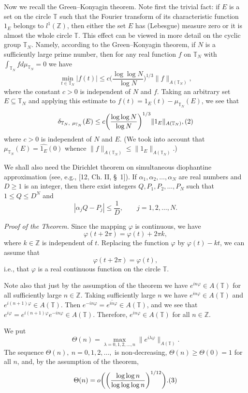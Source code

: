 \documentclass[12pt]{article}
\begin{document}
  Now we recall the Green--Konyagin theorem. Note first the
trivial fact: if $E$ is a set on the circle $\mathbb T$ such that
the Fourier transform of its characteristic function $1_E$ belongs
to $l^1(\mathbb Z)$, then either the set $E$ has (Lebesgue)
measure zero or it is almost the whole circle $\mathbb T$. This
effect can be viewed in more detail on the cyclic group $\mathbb
T_N$. Namely, according to the Green--Konyagin theorem, if $N$ is
a sufficiently large prime number, then for any real function $f$
on $\mathbb T_N$ with $\int_{\mathbb T_N}f d\mu_{\mathbb T_N}=0$
we have
$$
\min_{t\in\mathbb T_N}|f(t)|\leq
c\bigg(\frac{\log\log N}{\log N}\bigg)^{1/3}\|f\|_{A(\mathbb T_N)},
$$
where the constant $c>0$ is independent of $N$ and $f$. Taking an
arbitrary set $E\subseteq\mathbb T_N$ and applying this estimate
to $f(t)=1_E(t)-\mu_{\mathbb T_N}(E)$, we see that
$$
\delta_{\mathbb T_N, ~\mu_{\mathbb T_N}}(E)\leq
c \bigg(\frac{\log\log N}{\log N}\bigg)^{1/3}\|1_E\|_{A(\mathbb T_N)},
\relax(2)
$$
where $c>0$ is independent of $N$ and $E$. (We took into account
that $\mu_{\mathbb T_N}(E)=\widehat{1_E}(0)$ whence
$\|f\|_{A(\mathbb T_N)}\leq\|1_E\|_{A(\mathbb T_N)}$.)

  We shall also need the Dirichlet theorem on
simultaneous diophantine approximation (see, e.g., [12, Ch. II,
\S~1]). If $\alpha_1, \alpha_2, \ldots, \alpha_N$ are real numbers
and $D\geq 1$ is an integer, then there exist integers $Q, P_1,
P_2, \ldots, P_N$ such that $1\leq Q\leq D^N$ and
$$
|\alpha_jQ-P_j|\leq\frac{1}{D}, \qquad j=1, 2, \ldots, N.
$$

\quad

  \emph{Proof of the Theorem.} Since the mapping $\varphi$ is
continuous, we have
$$
\varphi(t+2\pi)=\varphi(t)+2\pi k,
$$
where $k\in\mathbb Z$ is independent of $t$. Replacing the
function $\varphi$ by $\varphi(t)-kt$, we can assume that
$$
\varphi(t+2\pi)=\varphi(t),
$$
i.e., that $\varphi$ is a real continuous function on the circle
$\mathbb T$.

   Note also that just by the assumption of the theorem
we have $e^{in\varphi}\in A(\mathbb T)$ for all sufficiently large
$n\in\mathbb Z$. Taking sufficiently large $n$ we have
$e^{in\varphi}\in A(\mathbb T)$ and $e^{i(n+1)\varphi}\in
A(\mathbb T)$. Then $e^{-in\varphi}=\overline{e^{in\varphi}}\in
A(\mathbb T)$, and we see that
$e^{i\varphi}=e^{i(n+1)\varphi}e^{-in\varphi}\in A(\mathbb T)$.
Therefore, $e^{in\varphi}\in A(\mathbb T)$ for all $n\in\mathbb
Z$.

  We put
$$
\Theta(n)=\max_{\lambda=0, 1, 2, \ldots, n}
\|e^{i\lambda\varphi}\|_{A(\mathbb T)}.
$$
The sequence $\Theta(n), ~n=0, 1, 2, \ldots,$ is non-decreasing,
$\Theta(n)\geq\Theta(0)=1$ for all $n$, and, by the assumption of
the theorem,
$$
\Theta(n)=
o\bigg(\bigg(\frac{\log\log n}{\log\log\log n}\bigg)^{1/12}\bigg).
\relax(3)
$$
\end{document}
